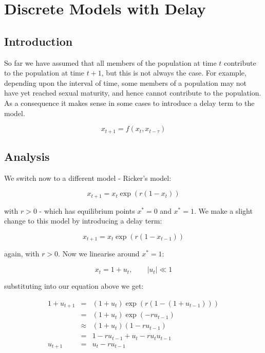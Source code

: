 \documentclass{report}
\begin{document}
\chapter{Discrete Models with Delay}




\section{Introduction}

So far we have assumed that all members of the population at time $t$ contribute to the
population at time $t + 1$, but this is not always the case. For example, depending upon
the interval of time, some members of a population may not have yet reached sexual
maturity, and hence cannot contribute to the population. As a consequence it makes sense
in some cases to introduce a delay term to the model. \bigskip

\[
    x_{t + 1} = f(x_t, x_{t - \tau})
\]\medskip




\section{Analysis}

We switch now to a different model - Ricker's model: \bigskip

\[
    x_{t + 1} = x_t \exp(r (1 - x_t))
\]\medskip

with $r > 0$ - which has equilibrium points $x^* = 0$ and $x^* = 1$. We make a slight
change to this model by introducing a delay term: \bigskip

\[
    x_{t + 1} = x_t \exp(r (1 - x_{t - 1}))
\]\medskip

again, with $r > 0$. Now we linearise around $x^* = 1$:\bigskip

\[
    x_t = 1 + u_t, \qquad \left|u_t\right| \ll 1
\]\medskip

substituting into our equation above we get: \bigskip

\begin{eqnarray*}
    1 + u_{t + 1} & = & (1 + u_t) \exp(r (1 - (1 + u_{t - 1}))) \\
                  & = & (1 + u_t) \exp(-r u_{t - 1}) \\
                  & \approx & (1 + u_t) (1 - r u_{t - 1}) \\
                  & = & 1 - r u_{t - 1} + u_t - r u_t u_{t - 1} \\
        u_{t + 1} & = & u_t - r u_{t - 1}
\end{eqnarray*}\medskip
\end{document}
